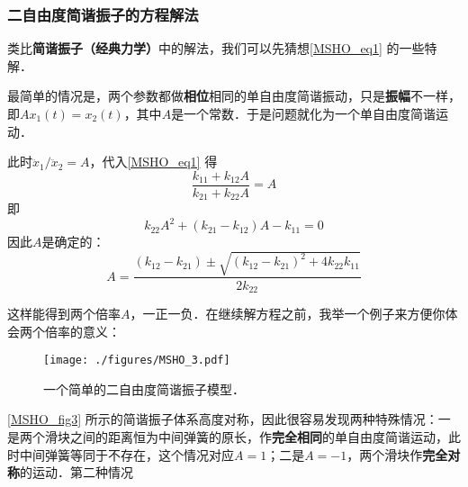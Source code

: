 \subsubsection{二自由度简谐振子的方程解法}

类比\textbf{简谐振子（经典力学）}中的解法，我们可以先猜想\autoref{MSHO_eq1} 的一些特解．

最简单的情况是，两个参数都做\textbf{相位}相同的单自由度简谐振动，只是\textbf{振幅}不一样，即$Ax_1(t) = x_2(t)$，其中$A$是一个常数．于是问题就化为一个单自由度简谐运动．

此时${\ddot{x}_1}/{\ddot{x}_2}=A$，代入\autoref{MSHO_eq1} 得
\begin{equation}
\frac{k_{11}+k_{12}A}{k_{21}+k_{22}A}=A
\end{equation}
即
\begin{equation}
k_{22}A^2+(k_{21}-k_{12})A-k_{11} = 0
\end{equation}
因此$A$是确定的：
\begin{equation}
A = \frac{(k_{12}-k_{21})\pm\sqrt{(k_{12}-k_{21})^2 + 4k_{22}k_{11}}}{2k_{22}}
\end{equation}

这样能得到两个倍率$A$，一正一负．在继续解方程之前，我举一个例子来方便你体会两个倍率的意义：
\begin{figure}[ht]
\centering
\texttt{[image: ./figures/MSHO\_3.pdf]}
\caption{一个简单的二自由度简谐振子模型．} \label{MSHO_fig3}
\end{figure}

\autoref{MSHO_fig3} 所示的简谐振子体系高度对称，因此很容易发现两种特殊情况：一是两个滑块之间的距离恒为中间弹簧的原长，作\textbf{完全相同}的单自由度简谐运动，此时中间弹簧等同于不存在，这个情况对应$A=1$；二是$A=-1$，两个滑块作\textbf{完全对称}的运动．第二种情况









